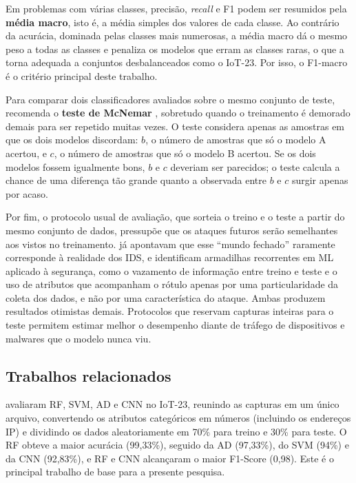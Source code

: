 \documentclass[alpha-refs,brazilian]{CC-EC_TF-TC}
\begin{document}
Em problemas com várias classes, precisão, \textit{recall} e F1 podem ser resumidos pela \textbf{média macro}, isto é, a média simples dos valores de cada classe. Ao contrário da acurácia, dominada pelas classes mais numerosas, a média macro dá o mesmo peso a todas as classes e penaliza os modelos que erram as classes raras, o que a torna adequada a conjuntos desbalanceados como o IoT-23. Por isso, o F1-macro é o critério principal deste trabalho.

Para comparar dois classificadores avaliados sobre o mesmo conjunto de teste, \citet{dietterich1998approximate} recomenda o \textbf{teste de McNemar} \citep{mcnemar1947}, sobretudo quando o treinamento é demorado demais para ser repetido muitas vezes. O teste considera apenas as amostras em que os dois modelos discordam: $b$, o número de amostras que só o modelo A acertou, e $c$, o número de amostras que só o modelo B acertou. Se os dois modelos fossem igualmente bons, $b$ e $c$ deveriam ser parecidos; o teste calcula a chance de uma diferença tão grande quanto a observada entre $b$ e $c$ surgir apenas por acaso.

Por fim, o protocolo usual de avaliação, que sorteia o treino e o teste a partir do mesmo conjunto de dados, pressupõe que os ataques futuros serão semelhantes aos vistos no treinamento. \citet{sommer2010outside} já apontavam que esse ``mundo fechado'' raramente corresponde à realidade dos IDS, e \citet{arp2022dos} identificam armadilhas recorrentes em ML aplicado à segurança, como o vazamento de informação entre treino e teste e o uso de atributos que acompanham o rótulo apenas por uma particularidade da coleta dos dados, e não por uma característica do ataque. Ambas produzem resultados otimistas demais. Protocolos que reservam capturas inteiras para o teste permitem estimar melhor o desempenho diante de tráfego de dispositivos e malwares que o modelo nunca viu.

\subsection{Trabalhos relacionados}

\citet{souza2024avaliacao} avaliaram RF, SVM, AD e CNN no IoT-23, reunindo as capturas em um único arquivo, convertendo os atributos categóricos em números (incluindo os endereços IP) e dividindo os dados aleatoriamente em 70\% para treino e 30\% para teste. O RF obteve a maior acurácia (99,33\%), seguido da AD (97,33\%), do SVM (94\%) e da CNN (92,83\%), e RF e CNN alcançaram o maior F1-Score (0,98). Este é o principal trabalho de base para a presente pesquisa.
\end{document}
